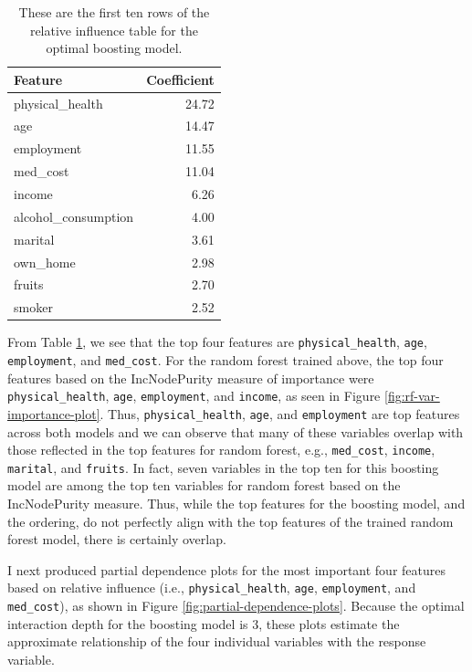 \documentclass[
]{article}
\begin{document}
\begin{table}[H]

\caption{\label{tab:boosting-relative-influence-table}These are the first ten rows of the relative influence 
        table for the optimal boosting model.}
\centering
\begin{tabular}[t]{lr}
\toprule
Feature & Coefficient\\
\midrule
physical\_health & 24.72\\
age & 14.47\\
employment & 11.55\\
med\_cost & 11.04\\
income & 6.26\\
\addlinespace
alcohol\_consumption & 4.00\\
marital & 3.61\\
own\_home & 2.98\\
fruits & 2.70\\
smoker & 2.52\\
\bottomrule
\end{tabular}
\end{table}

From Table \ref{tab:boosting-relative-influence-table}, we see that the top four features are \texttt{physical\_health}, \texttt{age}, \texttt{employment}, and \texttt{med\_cost}. For the random forest trained above, the top four features based on the IncNodePurity measure of importance were \texttt{physical\_health}, \texttt{age}, \texttt{employment}, and \texttt{income}, as seen in Figure \ref{fig:rf-var-importance-plot}. Thus, \texttt{physical\_health}, \texttt{age}, and \texttt{employment} are top features across both models and we can observe that many of these variables overlap with those reflected in the top features for random forest, e.g., \texttt{med\_cost}, \texttt{income}, \texttt{marital}, and \texttt{fruits}. In fact, seven variables in the top ten for this boosting model are among the top ten variables for random forest based on the IncNodePurity measure. Thus, while the top features for the boosting model, and the ordering, do not perfectly align with the top features of the trained random forest model, there is certainly overlap.

I next produced partial dependence plots for the most important four features based on relative influence (i.e., \texttt{physical\_health}, \texttt{age}, \texttt{employment}, and \texttt{med\_cost}), as shown in Figure \ref{fig:partial-dependence-plots}. Because the optimal interaction depth for the boosting model is 3, these plots estimate the approximate relationship of the four individual variables with the response variable.
\end{document}
